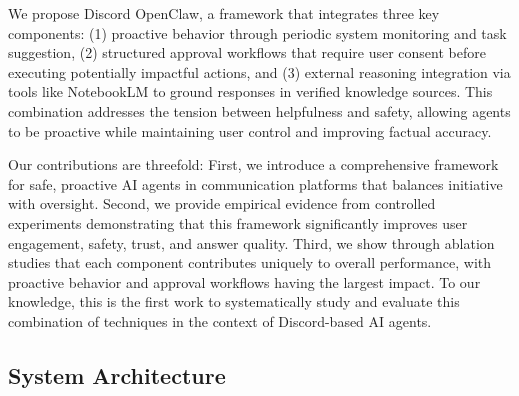 \documentclass[letterpaper,10pt]{article}
\begin{document}
We propose Discord OpenClaw, a framework that integrates three key components: (1) proactive behavior through periodic system monitoring and task suggestion, (2) structured approval workflows that require user consent before executing potentially impactful actions, and (3) external reasoning integration via tools like NotebookLM to ground responses in verified knowledge sources. This combination addresses the tension between helpfulness and safety, allowing agents to be proactive while maintaining user control and improving factual accuracy.

Our contributions are threefold: First, we introduce a comprehensive framework for safe, proactive AI agents in communication platforms that balances initiative with oversight. Second, we provide empirical evidence from controlled experiments demonstrating that this framework significantly improves user engagement, safety, trust, and answer quality. Third, we show through ablation studies that each component contributes uniquely to overall performance, with proactive behavior and approval workflows having the largest impact. To our knowledge, this is the first work to systematically study and evaluate this combination of techniques in the context of Discord-based AI agents.

\subsection{System Architecture}
\label{subsec:architecture}
\end{document}
